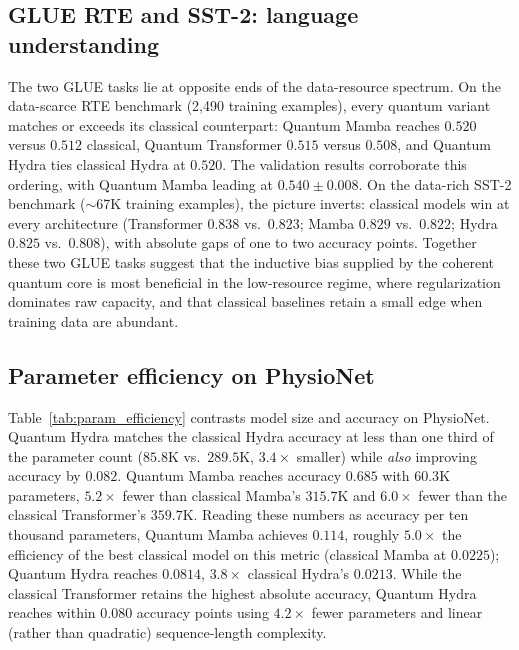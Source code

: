 \documentclass[conference]{IEEEtran}
\begin{document}
\subsection{GLUE RTE and SST-2: language understanding}
\label{sec:results_glue}

The two GLUE tasks lie at opposite ends of the data-resource spectrum. On the data-scarce RTE benchmark (2{,}490 training examples), every quantum variant matches or exceeds its classical counterpart: Quantum Mamba reaches $0.520$ versus $0.512$ classical, Quantum Transformer $0.515$ versus $0.508$, and Quantum Hydra ties classical Hydra at $0.520$. The validation results corroborate this ordering, with Quantum Mamba leading at $0.540 \pm 0.008$. On the data-rich SST-2 benchmark ($\sim$67K training examples), the picture inverts: classical models win at every architecture (Transformer $0.838$ vs.\ $0.823$; Mamba $0.829$ vs.\ $0.822$; Hydra $0.825$ vs.\ $0.808$), with absolute gaps of one to two accuracy points. Together these two GLUE tasks suggest that the inductive bias supplied by the coherent quantum core is most beneficial in the low-resource regime, where regularization dominates raw capacity, and that classical baselines retain a small edge when training data are abundant.

\subsection{Parameter efficiency on PhysioNet}
\label{sec:results_efficiency}

Table~\ref{tab:param_efficiency} contrasts model size and accuracy on PhysioNet. Quantum Hydra matches the classical Hydra accuracy at less than one third of the parameter count ($85.8$K vs.\ $289.5$K, $3.4\times$ smaller) while \emph{also} improving accuracy by $0.082$. Quantum Mamba reaches accuracy $0.685$ with $60.3$K parameters, $5.2\times$ fewer than classical Mamba's $315.7$K and $6.0\times$ fewer than the classical Transformer's $359.7$K. Reading these numbers as accuracy per ten thousand parameters, Quantum Mamba achieves $0.114$, roughly $5.0\times$ the efficiency of the best classical model on this metric (classical Mamba at $0.0225$); Quantum Hydra reaches $0.0814$, $3.8\times$ classical Hydra's $0.0213$. While the classical Transformer retains the highest absolute accuracy, Quantum Hydra reaches within $0.080$ accuracy points using $4.2\times$ fewer parameters and linear (rather than quadratic) sequence-length complexity.
\end{document}
